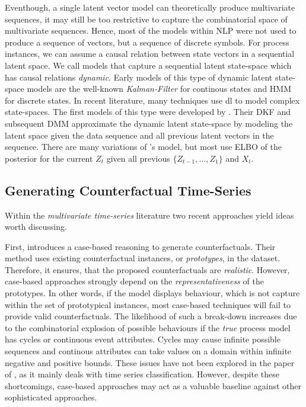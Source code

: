 \documentclass[./../../paper.tex]{subfiles}
\begin{document}
Eventhough, a single latent vector model can theoretically produce multivariate sequences, it may still be too restrictive to capture the combinatorial space of multivariate sequences. Hence, most of the models within \gls{NLP} were not used to produce a sequence of vectors, but a sequence of discrete symbols. For process instances, we can assume a causal relation between state vectors in a sequential latent space. We call models that capture a sequential latent state-space which has causal relations \emph{dynamic}\autocite{leglaive_RecurrentVariationalAutoencoder_2020}. Early models of this type of dynamic latent state-space models are the well-known \emph{Kalman-Filter} for continous states and \gls{HMM} for discrete states. In recent literature, many techniques use \gls{dl} to model complex state-spaces. The first models of this type were developed by \citeauthor{krishnan_StructuredInferenceNetworks_2017}. Their \gls{DKF} and subsequent \gls{DMM} approximate the dynamic latent state-space by modeling the latent space given the data sequence and all previous latent vectors in the sequence. There are many variations of \citeauthor{krishnan_StructuredInferenceNetworks_2017}'s model, but most use \gls{ELBO} of the posterior for the current $Z_{t}$ given all previous $\{Z_{t-1},\ldots,Z_{1}\}$ and $X_{t}$.

\subsection{Generating Counterfactual Time-Series}
Within the \emph{multivariate time-series} literature two recent approaches yield ideas worth discussing.

First, \citeauthor{delaney_InstanceBasedCounterfactualExplanations_2021} introduces a case-based reasoning to generate counterfactuals. Their method uses existing counterfactual instances, or \emph{prototypes}, in the dataset. Therefore, it ensures, that the proposed counterfactuals are \emph{realistic}. However, case-based approaches strongly depend on the \emph{representativeness} of the prototypes\needscite{}. In other words, if the model displays behaviour, which is not capture within the set of prototypical instances, most case-based techniques will fail to provide valid counterfactuals. The likelihood of such a break-down increases due to the combinatorial explosion of possible behaviours if the \emph{true} process model has cycles or continuous event attributes. Cycles may cause infinite possible sequences and continous attributes can take values on a domain within infinite negative and positive bounds. These issues have not been explored in the paper of \citeauthor{delaney_InstanceBasedCounterfactualExplanations_2021}, as it mainly deals with time series classification. However, despite these shortcomings, case-based approaches may act as a valuable baseline against other sophisticated approaches.
\end{document}
